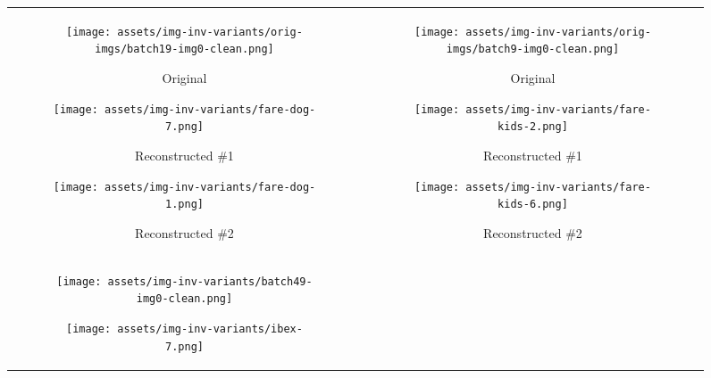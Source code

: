 \begin{figure*}[t]
\centering
\footnotesize
\begin{tabular}{c@{\hspace{1mm}}|@{\hspace{1mm}}c}
\begin{subfigure}[b]{0.16\textwidth}
    \caption*{\footnotesize Original}
    \texttt{[image: assets/img-inv-variants/orig-imgs/batch19-img0-clean.png]}
\end{subfigure}%
\hspace{0.5mm}%
\begin{subfigure}[b]{0.16\textwidth}
    \caption*{\footnotesize Reconstructed \#1}
    \texttt{[image: assets/img-inv-variants/fare-dog-7.png]}
\end{subfigure}%
\hspace{0.5mm}%
\begin{subfigure}[b]{0.16\textwidth}
    \caption*{\footnotesize Reconstructed \#2}
    \texttt{[image: assets/img-inv-variants/fare-dog-1.png]}
\end{subfigure}%
&
\begin{subfigure}[b]{0.16\textwidth}
    \caption*{\footnotesize Original}
    \texttt{[image: assets/img-inv-variants/orig-imgs/batch9-img0-clean.png]}
\end{subfigure}%
\hspace{0.5mm}%
\begin{subfigure}[b]{0.16\textwidth}
    \caption*{\footnotesize Reconstructed \#1}
    \texttt{[image: assets/img-inv-variants/fare-kids-2.png]}
\end{subfigure}%
\hspace{0.5mm}%
\begin{subfigure}[b]{0.16\textwidth}
    \caption*{\footnotesize Reconstructed \#2}
    \texttt{[image: assets/img-inv-variants/fare-kids-6.png]}
\end{subfigure}%
\\
\begin{subfigure}[b]{0.16\textwidth}
    \texttt{[image: assets/img-inv-variants/batch49-img0-clean.png]}
\end{subfigure}%
\hspace{0.5mm}%
\begin{subfigure}[b]{0.16\textwidth}
    \texttt{[image: assets/img-inv-variants/ibex-7.png]}

\end{subfigure}
\end{tabular}
\end{figure*}
